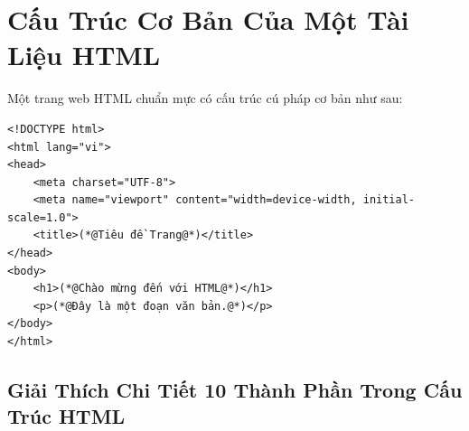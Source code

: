 \section{Cấu Trúc Cơ Bản Của Một Tài Liệu HTML}

Một trang web HTML chuẩn mực có cấu trúc cú pháp cơ bản như sau:

\begin{codeWindow}
\begin{lstlisting}[language=HTML5]
<!DOCTYPE html>
<html lang="vi">
<head>
    <meta charset="UTF-8">
    <meta name="viewport" content="width=device-width, initial-scale=1.0">
    <title>(*@Tiêu đề Trang@*)</title>
</head>
<body>
    <h1>(*@Chào mừng đến với HTML@*)</h1>
    <p>(*@Đây là một đoạn văn bản.@*)</p>
</body>
</html>
\end{lstlisting}
\end{codeWindow}

\subsection{Giải Thích Chi Tiết 10 Thành Phần Trong Cấu Trúc HTML}

